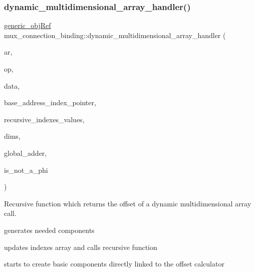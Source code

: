 \mbox{\label{classmux__connection__binding_a89ede1ce1d15207461df7fdf816a4a16}} 
\subsubsection{\texorpdfstring{dynamic\+\_\+multidimensional\+\_\+array\+\_\+handler()}{dynamic\_multidimensional\_array\_handler()}}
{\footnotesize\ttfamily \hyperlink{generic__obj_8hpp_acb533b2ef8e0fe72e09a04d20904ca81}{generic\+\_\+obj\+Ref} mux\+\_\+connection\+\_\+binding\+::dynamic\+\_\+multidimensional\+\_\+array\+\_\+handler (\begin{DoxyParamCaption}\item[{array\+\_\+ref $\ast$}]{ar,  }\item[{const \hyperlink{graph_8hpp_abefdcf0544e601805af44eca032cca14}{vertex} \&}]{op,  }\item[{const \hyperlink{op__graph_8hpp_a9a0b240622c47584bee6951a6f5de746}{Op\+Graph\+Const\+Ref}}]{data,  }\item[{unsigned int \&}]{base\+\_\+address\+\_\+index\+\_\+pointer,  }\item[{std\+::vector$<$ unsigned int $>$ \&}]{recursive\+\_\+indexes\+\_\+values,  }\item[{std\+::vector$<$ unsigned int $>$ \&}]{dims,  }\item[{\hyperlink{generic__obj_8hpp_acb533b2ef8e0fe72e09a04d20904ca81}{generic\+\_\+obj\+Ref} \&}]{global\+\_\+adder,  }\item[{const bool}]{is\+\_\+not\+\_\+a\+\_\+phi }\end{DoxyParamCaption})\hspace{0.3cm}{\ttfamily [private]}}



Recursive function which returns the offset of a dynamic multidimensional array call. 

generates needed components

updates indexes array and calls recursive function

starts to create basic components directly linked to the offset calculator 

